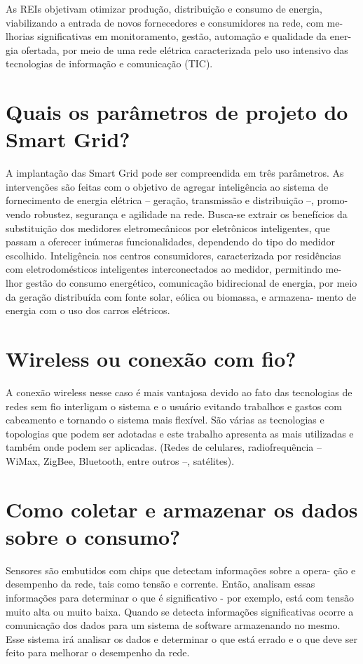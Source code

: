 	As REIs objetivam otimizar produção, distribuição e consumo de energia, viabilizando a entrada de novos fornecedores e consumidores na rede, com me- lhorias significativas em monitoramento, gestão, automação e qualidade da ener- gia ofertada, por meio de uma rede elétrica caracterizada pelo uso intensivo das tecnologias de informação e comunicação (TIC).

\section{Quais os parâmetros de projeto do Smart Grid?}

	A implantação das Smart Grid pode ser compreendida em três parâmetros. As intervenções são feitas com o objetivo de agregar inteligência ao sistema de fornecimento de energia elétrica – geração, transmissão e distribuição –, promo- vendo robustez, segurança e agilidade na rede. Busca-se extrair os benefícios da substituição dos medidores eletromecânicos por eletrônicos inteligentes, que passam a oferecer inúmeras funcionalidades, dependendo do tipo do medidor escolhido. Inteligência nos centros consumidores, caracterizada por residências com eletrodomésticos inteligentes interconectados ao medidor, permitindo me- lhor gestão do consumo energético, comunicação bidirecional de energia, por meio da geração distribuída com fonte solar, eólica ou biomassa, e armazena- mento de energia com o uso dos carros elétricos.

\section{Wireless ou conexão com fio?}

	A conexão wireless nesse caso é mais vantajosa devido ao fato das tecnologias de redes sem fio interligam o sistema e o usuário evitando trabalhos e gastos com cabeamento e tornando o sistema mais flexível. São várias as tecnologias e topologias que podem ser adotadas e este trabalho apresenta as mais utilizadas e também onde podem ser aplicadas. (Redes de celulares, radiofrequência – WiMax, ZigBee, Bluetooth, entre outros –, satélites).

\section{Como coletar e armazenar os dados sobre o consumo?}
	
	Sensores são embutidos com chips que detectam informações sobre a opera- ção e desempenho da rede, tais como tensão e corrente. Então, analisam essas informações para determinar o que é significativo - por exemplo, está com tensão muito alta ou muito baixa. Quando se detecta informações significativas ocorre a comunicação dos dados para um sistema de software armazenando no mesmo. Esse sistema irá analisar os dados e determinar o que está errado e o que deve ser feito para melhorar o desempenho da rede.

